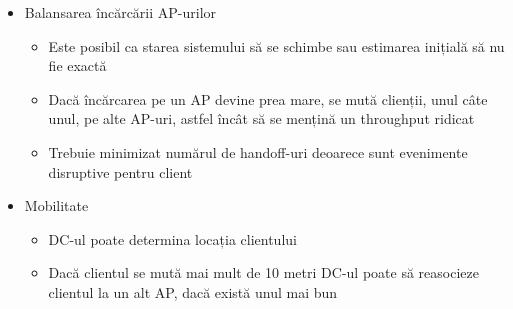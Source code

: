\begin{frame}
\begin{itemize}
  \item Balansarea încărcării AP-urilor
  \begin{itemize}
    \item Este posibil ca starea sistemului să se schimbe sau estimarea inițială să nu fie exactă
    \item Dacă încărcarea pe un AP devine prea mare, se mută clienții, unul câte unul, pe alte AP-uri, astfel încât să se mențină un throughput ridicat
    \item Trebuie minimizat numărul de handoff-uri deoarece sunt evenimente disruptive pentru client
  \end{itemize}
  \item Mobilitate
  \begin{itemize}
    \item DC-ul poate determina locația clientului
    \item Dacă clientul se mută mai mult de 10 metri DC-ul poate să reasocieze clientul la un alt AP, dacă există unul mai bun
  \end{itemize}
\end{itemize}
\end{frame}


